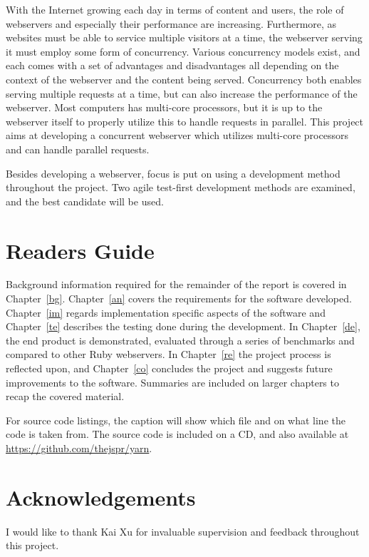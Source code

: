 %
With the Internet growing each day in terms of content and users, the role of
webservers and especially their performance are increasing. Furthermore, as
websites must be able to service multiple visitors at a time, the webserver
serving it must employ some form of concurrency. Various concurrency models
exist, and each comes with a set of advantages and disadvantages all
depending on the context of the webserver and the content being served.
Concurrency both enables serving multiple requests at a time, but can also
increase the performance of the webserver. Most computers has multi-core
processors, but it is up to the webserver itself to properly utilize this to
handle requests in parallel. This project aims at developing a concurrent
webserver which utilizes multi-core processors and can handle parallel
requests.

Besides developing a webserver, focus is put on using a development method
throughout the project. Two agile test-first development methods are examined,
and the best candidate will be used. 

\section{Readers Guide}
Background information required for the remainder of the report is covered in
Chapter~\ref{bg}. Chapter~\ref{an} covers the requirements for the software
developed. Chapter~\ref{im} regards implementation specific aspects of the
software and Chapter~\ref{te} describes the testing done during the
development. In Chapter~\ref{de}, the end product is demonstrated,
evaluated through a series of benchmarks and compared to other Ruby
webservers. In Chapter~\ref{re} the project process is reflected upon, and
Chapter~\ref{co} concludes the project and suggests future improvements to the
software. Summaries are included on larger chapters to recap the covered
material.

For source code listings, the caption will show which file and on what line
the code is taken from. The source code is included on a CD, and also
available at \url{https://github.com/thejspr/yarn}.

\section{Acknowledgements}
I would like to thank Kai Xu for invaluable supervision and feedback
throughout this project.
